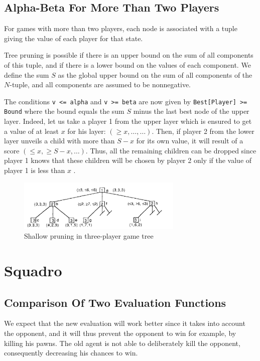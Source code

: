 \documentclass[journal,onecolumn]{IEEEtran}
\newcommand{\py}[1]{\texttt{#1}}
\begin{document}
\subsection{Alpha-Beta For More Than Two Players}
For games with more than two players, each node is associated with a tuple giving the value of each player for that state.

Tree pruning is possible if there is an upper bound on the sum of all components of this tuple, and if there is a lower bound on the values of each component.
We define the sum $S$ as the global upper bound on the sum of all components of the \(N\)-tuple, and all components are assumed to be nonnegative. 

The conditions \py{v <= alpha} and \py{v >= beta} are now given by \py{Best[Player] >= Bound} where the bound equals the sum $S$ minus the last best node of the upper layer.
Indeed, let us take a player 1 from the upper layer which is ensured to get a value of at least $x$ for his layer: $(\ge x, \dots, \dots)$. Then, if player 2 from the lower layer unveils a child with more than $S - x$ for its own value, it will result of a score $(\le x, \ge S - x, \dots)$. Thus, all the remaining children can be dropped since player 1 knows that these children will be chosen by player 2 only if the value of player 1 is less than $x$ \cite{multiplayer}.

\begin{figure}[H]
 \centering
 \includegraphics[width=0.7\textwidth]{img/multiplayer.png}
 \caption{Shallow pruning in three-player game tree \cite{multiplayer}}
 \label{fig:multiplayer}
\end{figure}


\section{Squadro}

\subsection{Comparison Of Two Evaluation Functions}

We expect that the new evaluation will work better since it takes into account the opponent, and it will thus prevent the opponent to win for example, by killing his pawns. The old agent is not able to deliberately kill the opponent, consequently decreasing his chances to win.
\end{document}
